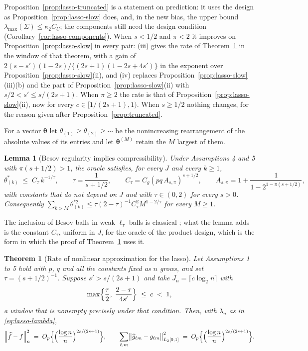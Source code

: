 \documentclass[10pt]{book}
\newtheorem{theorem}{Theorem}[section]
\newtheorem{lemma}{Lemma}[section]
\theoremstyle{definition}
\newcommand{\normn}[1]{\left\lVert #1 \right\rVert_{n}}
\newcommand{\cv}{\ell}
\newcommand{\md}{m}
\newcommand{\gcomp}[2]{g_{#1#2}}
\newcommand{\btheta}{\boldsymbol{\theta}}
\newcommand{\Gram}{\Sigma}
\newcommand{\penn}{\lambda_{n}}
\newcommand{\seff}{s'}
\newcommand{\lmaxx}{\lambda_{\max}}
\begin{document}
{Proposition~\ref{prop:lasso-truncated} is a statement on prediction: it uses
the design as Proposition~\ref{prop:lasso-slow} does, and, in the new bias,
the upper bound $\lmaxx(\Gram) \le \kappa_2C_U$; the components still need
the design condition (Corollary~\ref{cor:lasso-components}). When $s < 1/2$
and $\pi < 2$ it improves on Proposition~\ref{prop:lasso-slow} in every pair:
(iii) gives the rate of Theorem~\ref{thm:lasso-main} in the window of that
theorem, with a gain of $2(s-\seff)(1-2s)/\{(2s+1)(1-2s+4\seff)\}$ in the
exponent over Proposition~\ref{prop:lasso-slow}(ii), and (iv) replaces
Proposition~\ref{prop:lasso-slow}(iii)(b) and the part of
Proposition~\ref{prop:lasso-slow}(ii) with $s/2 < \seff \le s/(2s+1)$. When
$\pi \ge 2$ the rate is that of Proposition~\ref{prop:lasso-slow}(ii), now
for every $c \in [1/(2s+1),1)$. When $s \ge 1/2$ nothing changes, for the
reason given after Proposition~\ref{prop:truncated}.

For a vector $\btheta$ let $\theta_{(1)} \ge \theta_{(2)} \ge \cdots$ be the
nonincreasing rearrangement of the absolute values of its entries and let
$\btheta^{(M)}$ retain the $M$ largest of them.

\begin{lemma}[Besov regularity implies compressibility]
\label{lem:lasso-weak}
Under Assumptions 4 and 5 with $\pi(s+1/2) > 1$, the oracle satisfies, for
every $J$ and every $k \ge 1$,
\[
  \theta^{*}_{(k)} \;\le\; C_\tau\,k^{-1/\tau},
  \qquad \tau = \frac{1}{s+1/2},
  \qquad C_\tau = C_g(pq\,A_{s,\pi})^{s+1/2},
  \qquad A_{s,\pi} = 1 + \frac{1}{1-2^{1-\pi(s+1/2)}},
\]
with constants that do not depend on $J$ and with $\tau \in (0,2)$ for every
$s > 0$. Consequently
$\sum_{k>M}\theta^{*2}_{(k)} \le \tau(2-\tau)^{-1}C_\tau^{2}M^{1-2/\tau}$ for
every $M \ge 1$.
\end{lemma}

The inclusion of Besov balls in weak $\ell_\tau$ balls is classical
\citep[Proposition~9.15]{johnstone2019gaussian}; what the lemma adds is the
constant $C_\tau$, uniform in $J$, for the oracle of the product design, which
is the form in which the proof of Theorem~\ref{thm:lasso-main} uses it.

\begin{theorem}[Rate of nonlinear approximation for the lasso]
\label{thm:lasso-main}
Let Assumptions 1 to 5 hold with $p$, $q$ and all the constants fixed as $n$
grows, and set $\tau = (s+1/2)^{-1}$. Suppose $\seff > s/(2s+1)$ and take
$J_n = \lceil c \log_2 n\rceil$ with
\begin{equation}
  \label{eq:lasso-window}
  \max\Bigl\{\frac{\tau}{2},\; \frac{2-\tau}{4\seff}\Bigr\}
  \;\le\; c \;<\; 1 ,
\end{equation}
a window that is nonempty precisely under that condition. Then, with $\penn$
as in \eqref{eq:lasso-lambda},
\[
  \normn{\widehat{f}-f}^{2}
  \;=\; O_p\Bigl\{\Bigl(\frac{\log n}{n}\Bigr)^{2s/(2s+1)}\Bigr\},
  \qquad
  \sum_{\cv,\md}\bigl\lVert \widehat{g}_{\cv\md}-\gcomp{\cv}{\md}
  \bigr\rVert_{L_2[0,1]}^{2}
  \;=\; O_p\Bigl\{\Bigl(\frac{\log n}{n}\Bigr)^{2s/(2s+1)}\Bigr\} .
\]
\end{theorem}

}
\end{document}
